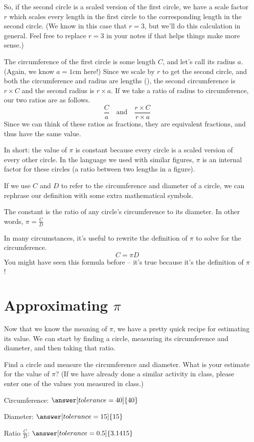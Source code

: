 \documentclass{ximera}
\begin{document}
\begin{example}
So, if the second circle is a scaled version of the first circle, we have a scale factor $r$ which scales every length in the first circle to the corresponding length in the second circle. (We know in this case that $r=3$, but we'll do this calculation in general. Feel free to replace $r=3$ in your notes if that helps things make more sense.)

The circumference of the first circle is some length $C$, and let's call its radius $a$. (Again, we know $a=1$cm here!) Since we scale by $r$ to get the second circle, and both the circumference and radius are lengths (), the second circumference is $r \times C$ and the second radius is $r \times a$. If we take a ratio of radius to circumference, our two ratios are as follows.
\[
\frac{C}{a} \quad \textrm{and} \quad \frac{r\times C}{r\times a}
\]
Since we can think of these ratios as fractions, they are equivalent fractions, and thus have the same value.

\end{example}

In short: the value of $\pi$ is constant because every circle is a scaled version of every other circle. In the language we used with similar figures, $\pi$ is an internal factor for these circles (a ratio between two lengths in a figure).

If we use $C$ and $D$ to refer to the circumference and diameter of a circle, we can rephrase our definition with some extra mathematical symbols.
\begin{definition}
The constant \dfn{$\pi$} is the ratio of any circle's circumference to its diameter. In other words, $\pi = \frac{C}{D}$
\end{definition}
In many circumstances, it's useful to rewrite the definition of $\pi$ to solve for the circumference.
\[
C = \pi D
\]
You might have seen this formula before -- it's true because it's the definition of $\pi$!


\section{Approximating $\pi$}

Now that we know the meaning of $\pi$, we have a pretty quick recipe for estimating its value. We can start by finding a circle, measuring its circumference and diameter, and then taking that ratio. 
\begin{question}
Find a circle and measure the circumference and diameter. What is your estimate for the value of $\pi$? (If we have already done a similar activity in class, please enter one of the values you measured in class.)

Circumference: $\answer[tolerance=40]{40}$

Diameter: $\answer[tolerance=15]{15}$

Ratio $\frac{C}{D}$: $\answer[tolerance=0.5]{3.1415}$
\end{question}
\end{document}
